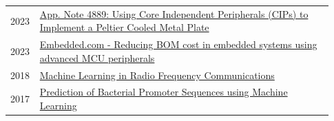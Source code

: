 \documentclass[
	10pt, %
]{FreemanCV}
\begin{document}
\begin{supertabular}{p{0.05\linewidth} p{0.88\linewidth}} %
	
	2023 & \href{
	https://ww1.microchip.com/downloads/aemDocuments/documents/MCU08/ApplicationNotes/ApplicationNotes/AN4889-Using-CIPs-To-Implement-Peltier-Plate-DS00004889.pdf
	}{
	App. Note 4889: Using Core Independent Peripherals (CIPs) to Implement a Peltier Cooled Metal Plate
	\linkcolor\scriptsize\faLink} \\[5pt]
	2023 & \href{
	https://www.embedded.com/reducing-bom-cost-in-embedded-systems-using-advanced-mcu-peripherals/
	}{
	Embedded.com - Reducing BOM cost in embedded systems using advanced MCU peripherals
	\linkcolor\scriptsize\faLink} \\[5pt]
	2018 & \href{
	http://joshbooth.us/wp-content/uploads/2023/08/Machine-Learning-in-Radio-Frequency-Communications.pdf
	}{
	Machine Learning in Radio Frequency Communications
	\linkcolor\scriptsize\faLink} \\[5pt]
	2017 & \href{
	http://joshbooth.us/wp-content/uploads/2023/08/poster_SBME_promoter_predictions.pdf
	}{
	Prediction of Bacterial Promoter Sequences using Machine Learning
	\linkcolor\scriptsize\faLink} \\[5pt]
	
\end{supertabular}

\medskip %


\end{document}
